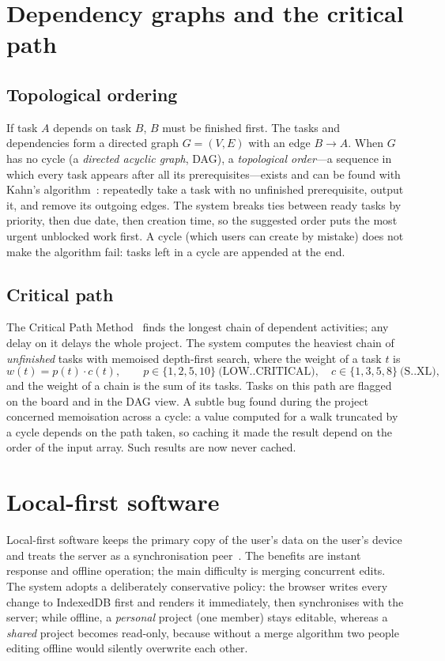 \documentclass[../main.tex]{subfiles}
\begin{document}
\section{Dependency graphs and the critical path}
\subsection{Topological ordering}
If task $A$ depends on task $B$, $B$ must be finished first. The tasks and dependencies form a
directed graph $G=(V,E)$ with an edge $B \rightarrow A$. When $G$ has no cycle (a \emph{directed
acyclic graph}, DAG), a \emph{topological order}---a sequence in which every task appears after all
its prerequisites---exists and can be found with Kahn's algorithm~\cite{kahn1962topological}:
repeatedly take a task with no unfinished prerequisite, output it, and remove its outgoing edges.
The system breaks ties between ready tasks by priority, then due date, then creation time, so the
suggested order puts the most urgent unblocked work first. A cycle (which users can create by
mistake) does not make the algorithm fail: tasks left in a cycle are appended at the end.

\subsection{Critical path}
The Critical Path Method~\cite{kelley1959cpm} finds the longest chain of dependent activities; any
delay on it delays the whole project. The system computes the heaviest chain of \emph{unfinished} tasks
with memoised depth-first search, where the weight of a task $t$ is
\[
w(t) = p(t)\cdot c(t), \qquad
p \in \{1,2,5,10\}\ \text{(LOW..CRITICAL)},\quad
c \in \{1,3,5,8\}\ \text{(S..XL)},
\]
and the weight of a chain is the sum of its tasks. Tasks on this path are flagged on the board and in
the DAG view. A subtle bug found during the project concerned memoisation across a cycle: a value
computed for a walk truncated by a cycle depends on the path taken, so caching it made the result
depend on the order of the input array. Such results are now never cached.

\section{Local-first software}
Local-first software keeps the primary copy of the user's data on the user's device and treats the
server as a synchronisation peer~\cite{kleppmann2019localfirst}. The benefits are instant response
and offline operation; the main difficulty is merging concurrent edits. The system adopts a deliberately
conservative policy: the browser writes every change to IndexedDB first and renders it immediately,
then synchronises with the server; while offline, a \emph{personal} project (one member) stays
editable, whereas a \emph{shared} project becomes read-only, because without a merge algorithm two
people editing offline would silently overwrite each other.
\end{document}
